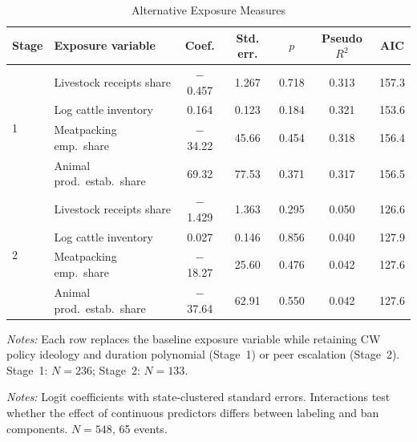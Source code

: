 \documentclass[12pt]{article}
\begin{document}
\begin{appendices}
\begin{table}[htbp]
\centering
\begin{threeparttable}
\caption{Alternative Exposure Measures}
\label{tab:alt_exposure}
\begin{tabular}{llccccc}
\toprule
Stage & Exposure variable & Coef. & Std. err. & $p$ & Pseudo $R^2$ & AIC \\
\midrule
\multirow{4}{*}{1} & Livestock receipts share & $-$0.457 & 1.267 & 0.718 & 0.313 & 157.3 \\
 & Log cattle inventory & 0.164 & 0.123 & 0.184 & 0.321 & 153.6 \\
 & Meatpacking emp.\ share & $-$34.22 & 45.66 & 0.454 & 0.318 & 156.4 \\
 & Animal prod.\ estab.\ share & 69.32 & 77.53 & 0.371 & 0.317 & 156.5 \\
\midrule
\multirow{4}{*}{2} & Livestock receipts share & $-$1.429 & 1.363 & 0.295 & 0.050 & 126.6 \\
 & Log cattle inventory & 0.027 & 0.146 & 0.856 & 0.040 & 127.9 \\
 & Meatpacking emp.\ share & $-$18.27 & 25.60 & 0.476 & 0.042 & 127.6 \\
 & Animal prod.\ estab.\ share & $-$37.64 & 62.91 & 0.550 & 0.042 & 127.6 \\
\bottomrule
\end{tabular}
\begin{tablenotes}[flushleft]
\footnotesize
\item \textit{Notes:} Each row replaces the baseline exposure variable while retaining CW policy ideology and duration polynomial (Stage~1) or peer escalation (Stage~2).  Stage~1: $N = 236$; Stage~2: $N = 133$.
\end{tablenotes}
\end{threeparttable}
\end{table}

\begin{table}[htbp]
\centering
\begin{threeparttable}
\caption{Component Hazard Model with Component Interactions}
\label{tab:component_interaction}
\scriptsize

\begin{tablenotes}[flushleft]
\footnotesize
\item \textit{Notes:} Logit coefficients with state-clustered standard errors.  Interactions test whether the effect of continuous predictors differs between labeling and ban components.  $N = 548$, 65 events.
\end{tablenotes}
\end{threeparttable}
\end{table}


\end{appendices}
\end{document}
